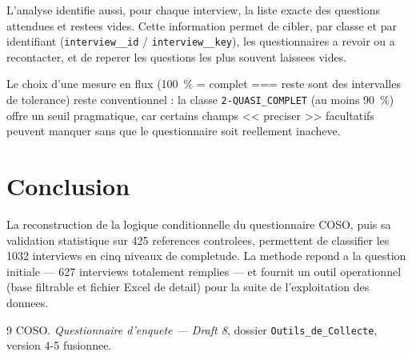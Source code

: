 \documentclass[11pt,a4paper]{article}
\begin{document}
L'analyse identifie aussi, pour chaque interview, la liste exacte des
questions attendues et restees vides. Cette information permet de cibler,
par classe et par identifiant (\texttt{interview\_\_id} /
\texttt{interview\_\_key}), les questionnaires a revoir ou a recontacter,
et de reperer les questions les plus souvent laissees vides.

Le choix d'une mesure en flux (100~\% = complet === reste sont des
intervalles de tolerance) reste conventionnel : la classe
\texttt{2-QUASI\_COMPLET} (au moins 90~\%) offre un seuil pragmatique, car
certains champs << preciser >> facultatifs peuvent manquer sans que le
questionnaire soit reellement inacheve.

\section{Conclusion}

La reconstruction de la logique conditionnelle du questionnaire COSO, puis
sa validation statistique sur 425 references controlees, permettent de
classifier les 1032 interviews en cinq niveaux de completude. La methode
repond a la question initiale --- 627 interviews totalement remplies --- et
fournit un outil operationnel (base filtrable et fichier Excel de detail)
pour la suite de l'exploitation des donnees.

\begin{thebibliography}{9}
  COSO. \emph{Questionnaire d'enquete --- Draft 8}, dossier
  \texttt{Outils\_de\_Collecte}, version 4-5 fusionnee.
\end{thebibliography}
\end{document}
